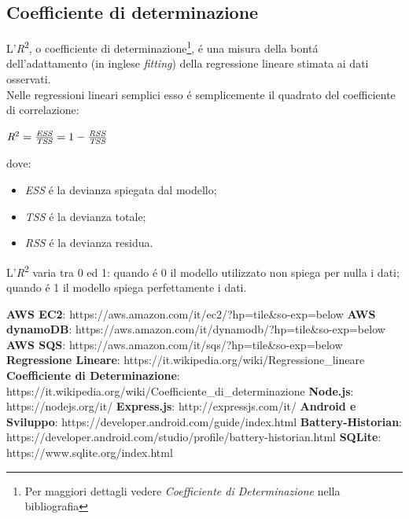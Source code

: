 \documentclass{article}
\begin{document}
\begin{appendices}
	\section{Coefficiente di determinazione}\label{Coefficiente}
	
	L'\textit{R}\textsuperscript{2}, o coefficiente di determinazione\footnote{Per maggiori dettagli vedere \textit{Coefficiente di Determinazione} nella bibliografia}, \'e una misura della bont\'a dell'adattamento (in inglese \textit{fitting}) della regressione lineare stimata ai dati osservati. \\
	Nelle regressioni lineari semplici esso \'e semplicemente il quadrato del coefficiente di correlazione:

	\begin{center}
	\(\textit{R}\textsuperscript{2} =  \frac{\textit{ESS}}{\textit{TSS}} = 1 - \frac{\textit{RSS}}{\textit{TSS}}\)
	\end{center}

	dove:

	\begin{itemize}
	\item{\textit{ESS} \'e la devianza spiegata dal modello;}
	\item{\textit{TSS} \'e la devianza totale;}
	\item{\textit{RSS} \'e la devianza residua.}
	\end{itemize}

	L'\textit{R}\textsuperscript{2} varia tra 0 ed 1: quando \'e 0 il modello utilizzato non spiega per nulla i dati; quando \'e 1 il modello spiega perfettamente i dati.

\end{appendices}

\newpage

\begin{thebibliography}{1}

 \textbf{AWS EC2}: https://aws.amazon.com/it/ec2/?hp=tile\&so-exp=below
 \textbf{AWS dynamoDB}: https://aws.amazon.com/it/dynamodb/?hp=tile\&so-exp=below
 \textbf{AWS SQS}: https://aws.amazon.com/it/sqs/?hp=tile\&so-exp=below
 \textbf{Regressione Lineare}: https://it.wikipedia.org/wiki/Regressione\_lineare
 \textbf{Coefficiente di Determinazione}: https://it.wikipedia.org/wiki/Coefficiente\_di\_determinazione
 \textbf{Node.js}: https://nodejs.org/it/
 \textbf{Express.js}: http://expressjs.com/it/
 \textbf{Android e Sviluppo}: https://developer.android.com/guide/index.html 
 \textbf{Battery-Historian}: https://developer.android.com/studio/profile/battery-historian.html
 \textbf{SQLite}: https://www.sqlite.org/index.html
\end{thebibliography}


\end{document}
